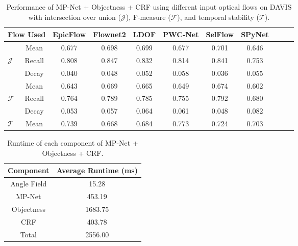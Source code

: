 \documentclass[10pt,letterpaper]{article}
\begin{document}
\begin{table*}
\footnotesize
\begin{center}
\begin{tabular}{l | c | c cccccccc}
\hline
\multicolumn{2}{c|}{Flow Used} & EpicFlow & Flownet2 & LDOF & PWC-Net & SelFlow & SPyNet \\ \hline
                & Mean       & 0.677                   & 0.698                   & 0.699               & 0.677                  & 0.701                  & 0.646                 \\
\textit{$\mathcal{J}$}      & Recall     & 0.808                   & 0.847                   & 0.832               & 0.814                  & 0.841                  & 0.753                 \\
                & Decay      & 0.040                   & 0.048                   & 0.052               & 0.058                  & 0.036                  & 0.055                 \\ \hline
                & Mean       & 0.643                   & 0.669                   & 0.665               & 0.649                  & 0.674                  & 0.602                 \\
\textit{$\mathcal{F}$}      & Recall     & 0.764                   & 0.789                   & 0.785               & 0.755                  & 0.792                  & 0.680                 \\
                & Decay      & 0.053                   & 0.057                   & 0.064               & 0.061                  & 0.048                  & 0.082                 \\ \hline
\textit{$\mathcal{T}$}      & Mean       & 0.739                   & 0.668                   & 0.684               & 0.773                  & 0.724                  & 0.703                 \\ \hline
\end{tabular}
\caption{Performance of MP-Net + Objectness + CRF using different input optical flows on DAVIS with intersection over
union ($\mathcal{J}$), F-measure ($\mathcal{F}$), and temporal stability
($\mathcal{T}$).}
\vspace{-0.7cm}
\end{center}
\end{table*}

\begin{table*}
\footnotesize
\begin{center}
\begin{tabular}{c|c}
\hline
Component   & Average Runtime (ms) \\ \hline
Angle Field & 15.28                \\
MP-Net      & 453.19               \\
Objectness  & 1683.75              \\
CRF         & 403.78               \\
Total       & 2556.00
\end{tabular}
\caption{Runtime of each component of MP-Net + Objectness + CRF.}
\vspace{-0.7cm}
\end{center}
\end{table*}
\end{document}
